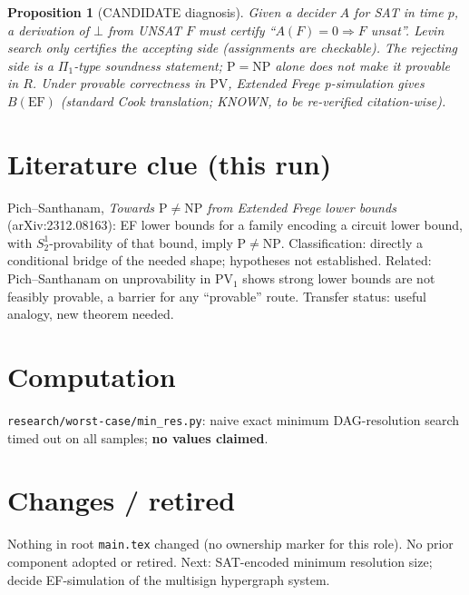 \documentclass{article}
\newtheorem{prop}{Proposition}
\begin{document}
\begin{prop}[CANDIDATE diagnosis] Given a decider $A$ for SAT in time $p$, a derivation of $\bot$ from UNSAT $F$ must certify
``$A(F)=0\Rightarrow F$ unsat''. Levin search only certifies the accepting side (assignments are checkable). The rejecting side is a
$\Pi_1$-type soundness statement; $\mathrm P=\mathrm{NP}$ alone does not make it provable in $R$. Under provable correctness in $\mathrm{PV}$,
Extended Frege p-simulation gives $B(\mathrm{EF})$ (standard Cook translation; KNOWN, to be re-verified citation-wise).\end{prop}

\section{Literature clue (this run)}
Pich--Santhanam, \emph{Towards $\mathrm P\ne\mathrm{NP}$ from Extended Frege lower bounds} (arXiv:2312.08163): EF lower bounds for
a family encoding a circuit lower bound, with $S^1_2$-provability of that bound, imply $\mathrm P\ne\mathrm{NP}$. Classification:
directly a conditional bridge of the needed shape; hypotheses not established. Related: Pich--Santhanam on unprovability in $\mathrm{PV}_1$
shows strong lower bounds are not feasibly provable, a barrier for any ``provable'' route. Transfer status: useful analogy, new theorem needed.

\section{Computation}
\texttt{research/worst-case/min\_res.py}: naive exact minimum DAG-resolution search timed out on all samples; \textbf{no values claimed}.

\section{Changes / retired}
Nothing in root \texttt{main.tex} changed (no ownership marker for this role). No prior component adopted or retired.
Next: SAT-encoded minimum resolution size; decide EF-simulation of the multisign hypergraph system.
\end{document}
